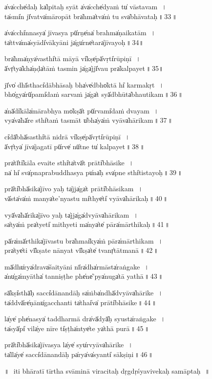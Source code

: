 \documentclass[parskip, 12pt, DIV=16, pagenumber=head,top, enableddeprecatedfontcommands]{scrartcl}
\begin{document}
a̍va̍cche̍daḥ ka̍lpita॒ḥ syāt a̍va̍cche̍dyaṁ tu̍ vāsta॒va॒m\,~।\\
ta̍smi̍n jī̍vatva̍māro॒pāt bra̍hma̍tva̍ṁ tu sva̍bhāva॒ta॒ḥ॒\,॥\,33\,॥

a̍va̍cchi̍nnasya̍ jīva॒sya pū̍rṇe̍na̍ brahma̍ṇaika॒tā॒m\,~।\\
ta̍ttva̍ma̍syādi̍vākyā॒ni ja̍gu̍rne̍tara̍jīva॒yo॒ḥ॒\,॥\,34॥

bra̍hma̍ṇya̍vasthi̍tā mā॒yā vi̍kṣe̍pā̍vṛti̍rūpi॒ṇī॒\,~।\\
ā̍vṛ̍tya̍kha̍ṇḍa̍tāṁ ta॒smin ja̍ga̍jjī̍vau pra̍kalpa॒ye॒t॒\,॥\,35॥

jī̍vo̍ dhī̍sthaci̍dābhā॒saḥ bha̍ve̍dbho̍ktā hi̍ karma॒kṛ॒t॒\,~।\\
bho̍gya̍rū̍pami̍daṁ sa॒rvaṁ ja̍ga̍t syā̍dbhūta̍bhauti॒ka॒m\,॥\,36\,॥

a̍nā̍di̍kāla̍māra॒bhya mo̍kṣā̍t pū̍rvami̍daṁ dva॒ya॒m\,~।\\
vya̍va̍hā̍re sthi̍taṁ ta॒smāt u̍bha̍ya̍ṁ vyāva̍hāri॒ka॒m\,॥\,37\,॥

ci̍dā̍bhā̍sasthi̍tā ni॒drā vi̍kṣe̍pā̍vṛti̍rūpi॒ṇī॒\,~।\\
ā̍vṛ̍tya̍ jīva̍jaga॒tī pū̍rve̍ nū̍tne tu̍ kalpa॒ye॒t॒\,॥\,38\,॥

pra̍tī̍ti̍kāla॒ evai॒te sthi̍ta̍tvā̍t prāti̍bhāsi॒ke॒\,~।\\
na̍ hi̍ sva̍pnapra॒buddha॒sya pu̍na̍ḥ sva̍pne sthi̍tista॒yo॒ḥ॒\,॥\,39\,॥

prā̍ti̍bhā̍sika̍jīvo॒ yaḥ ta̍jja̍ga̍t prāti̍bhāsi॒ka॒m\,~।\\
vā̍sta̍va̍ṁ manya̍te'nya॒stu mi̍thye̍ti̍ vyāva̍hāri॒ka॒ḥ॒\,॥\,40\,॥

\newpage

vyā̍va̍hā̍rika̍jīvo॒ yaḥ ta̍jja̍ga̍dvyāva̍hāri॒ka॒m\,~।\\
sa̍tya̍ṁ pra̍tyeti̍ mithye॒ti ma̍nya̍te̍ pāra̍mārthi॒ka॒ḥ॒\,॥\,41\,॥

pā̍ra̍mā̍rthika̍jīva॒stu bra̍hmai̍kya̍ṁ pāra̍mārthi॒ka॒m\,~।\\
pra̍tye̍ti vī̍kṣate nā॒nyat vī̍kṣa̍te̍ tvanṛ̍tātma॒nā॒\,॥\,42\,॥

mā̍dhu̍rya̍drava̍śaityā॒ni nī̍ra̍dha̍rmāsta̍raṅga॒ke॒\,~।\\
a̍nu̍ga̍myātha̍ tanni॒ṣṭhe phe̍ne̍'pya̍nuga̍tā ya॒thā॒\,॥\,43\,॥

sā̍kṣi̍sthā̍ḥ sacci̍dāna॒ndāḥ sa̍ṁba̍ndhā̍dvyāva̍hāri॒ke॒\,~।\\
ta̍ddvā̍re̍ṇānu̍gaccha॒nti ta̍thai̍va̍ prāti̍bhāsi॒ke॒\,॥\,44\,॥

la̍ye̍ phe̍nasya̍ taddha॒rmā dra̍vā̍dyā̍ḥ syusta̍raṅga॒ke॒\,~।\\
ta̍syā̍pi̍ vila̍ye nī॒re ti̍ṣṭha̍ntye̍te ya̍thā pu॒rā॒\,॥\,45\,॥

prā̍ti̍bhā̍sika̍jīva॒sya la̍ye̍ syu̍rvyāva̍hāri॒ke\,~।\\
ta̍lla̍ye̍ sacci̍dāna॒ndāḥ pa̍rya̍va̍syanti̍ sākṣi॒ṇi॒\,॥\,46\,॥

॥~\,i॒ti bhā॒ratī tīrtha svāminā viracitaḥ
dṛgdṛśyavivekaḥ samā॒pta॒ḥ॒\,~॥ \\

\vspace{2cm}
\end{document}
